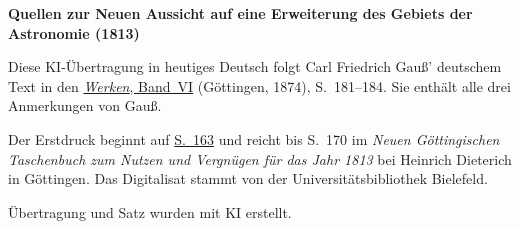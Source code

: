\clearpage\thispagestyle{empty}
\begin{center}\textbf{Quellen zur Neuen Aussicht auf eine Erweiterung des Gebiets der Astronomie (1813)}\end{center}
\noindent Diese KI-Übertragung in heutiges Deutsch folgt Carl Friedrich Gauß’ deutschem Text in den \href{https://gdz.sub.uni-goettingen.de/id/PPN236007467}{\textit{Werken}, Band~VI} (Göttingen, 1874), S.~181--184. Sie enthält alle drei Anmerkungen von Gauß.
\par\smallskip\noindent Der Erstdruck beginnt auf \href{https://ds.ub.uni-bielefeld.de/viewer/api/v1/records/2319262_013/files/images/00000197.tif/full/1250,/0/default.jpg}{S.~163} und reicht bis S.~170 im \textit{Neuen Göttingischen Taschenbuch zum Nutzen und Vergnügen für das Jahr 1813} bei Heinrich Dieterich in Göttingen. Das Digitalisat stammt von der Universitätsbibliothek Bielefeld.
\par\smallskip\noindent Übertragung und Satz wurden mit KI erstellt.
\clearpage
